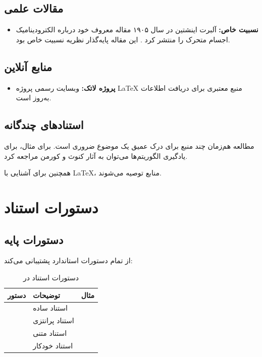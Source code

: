 \documentclass{matinbook}
\begin{document}
\section{مقالات علمی}

\begin{itemize}
    \item \textbf{نسبیت خاص:}
    آلبرت اینشتین در سال ۱۹۰۵ مقاله معروف خود
    درباره الکترودینامیک اجسام متحرک را منتشر کرد
    \cite{einstein1905}. این مقاله پایه‌گذار
    نظریه نسبیت خاص بود.
\end{itemize}

\section{منابع آنلاین}

\begin{itemize}
    \item \textbf{پروژه لاتک:}
    وبسایت رسمی پروژه \LaTeX{} \cite{latex-project}
    منبع معتبری برای دریافت اطلاعات به‌روز است.
\end{itemize}

\section{استنادهای چندگانه}

مطالعه هم‌زمان چند منبع برای درک عمیق یک موضوع
ضروری است. برای مثال، برای یادگیری الگوریتم‌ها
می‌توان به آثار کنوث \cite{knuth1984} و کورمن
\cite{cormen2009} مراجعه کرد.

همچنین برای آشنایی با \LaTeX{}، منابع
\cite{lamport1994,latex-project} توصیه می‌شوند.

\chapter{دستورات استناد}

\section{دستورات پایه}

 از تمام دستورات استاندارد 
پشتیبانی می‌کند:

\begin{table}[h]
\centering
\caption{دستورات استناد در }
\label{tab:citation-commands}
\begin{tabular}{|c|C{5cm}|c|}
\hline
\textbf{دستور} & \textbf{توضیحات} & \textbf{مثال} \\
\hline
{} & استناد ساده & \cite{knuth1984} \\
 & استناد پرانتزی & \parencite{lamport1994} \\
 & استناد متنی & \textcite{cormen2009} \\
 & استناد خودکار & \autocite{einstein1905} \\
\hline
\end{tabular}
\end{table}
\end{document}
